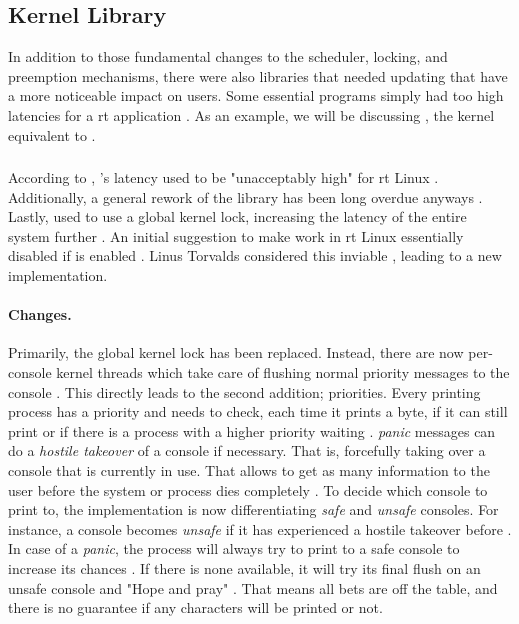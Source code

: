 \documentclass[10pt,twocolumn,a4paper]{article}
\begin{document}
\subsection{Kernel Library}
In addition to those fundamental changes to the scheduler, locking, and preemption mechanisms, there were also libraries that needed updating that have a more noticeable impact on users.
Some essential programs simply had too high latencies for a \acrshort{rt} application \cite{edge_discussion_2022}.
As an example, we will be discussing , the kernel equivalent to .

\subsubsection{}
According to \citeauthor{edge_discussion_2022}, 's latency used to be "unacceptably high" for \acrshort{rt} Linux \cite{edge_discussion_2022}.
Additionally, a general rework of the library has been long overdue anyways \cite{edge_discussion_2022}.
Lastly,  used to use a global kernel lock, increasing the latency of the entire system further \cite{gleixner_printk_2024}.
An initial suggestion to make  work in \acrshort{rt} Linux essentially disabled  if  is enabled \cite{mladek_printk_2022}.
Linus Torvalds considered this inviable \cite{torvalds_initial_2022}, leading to a new implementation.

\paragraph{Changes.}
Primarily, the global kernel lock has been replaced.
Instead, there are now per-console kernel threads which take care of flushing normal priority messages to the console \cite{gleixner_printk_2024}.
This directly leads to the second addition; priorities.
Every printing process has a priority and needs to check, each time it prints a byte, if it can still print or if there is a process with a higher priority waiting \cite{edge_discussion_2022}.
\emph{panic} messages can do a \emph{hostile takeover} of a console if necessary.
That is, forcefully taking over a console that is currently in use.
That allows to get as many information to the user before the system or process dies completely \cite{edge_discussion_2022}.
To decide which console to print to, the  implementation is now differentiating \emph{safe} and \emph{unsafe} consoles.
For instance, a console becomes \emph{unsafe} if it has experienced a hostile takeover before \cite{kernel_development_community_console}.
In case of a \emph{panic}, the process will always try to print to a safe console to increase its chances \cite{gleixner_printk_2024}.
If there is none available, it will try its final flush on an unsafe console and "Hope and pray" \cite{kernel_development_community_console}.
That means all bets are off the table, and there is no guarantee if any characters will be printed or not.
\end{document}
